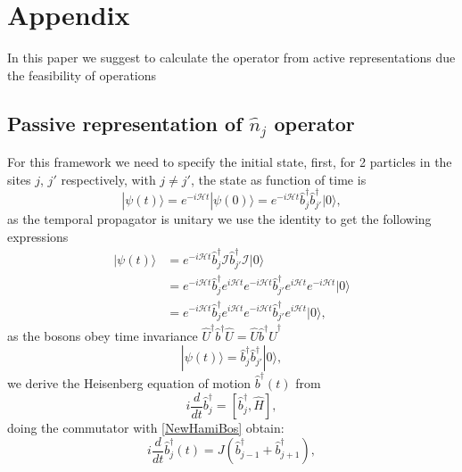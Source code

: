 \section{Appendix} \label{sec:appendix}
In this paper we suggest to calculate the operator from active representations due the feasibility of operations 
\subsection{Passive representation of $\hat{n}_j$ operator}\label{ap:pass}
For this framework we need to specify the initial state, first, for 2 particles in the sites $j$, $j'$ respectively, with $j\neq j'$, the state as function of time is 
\begin{equation} 
|\psi(t) \rangle = e^{-i\mathcal{H} t} |\psi(0)\rangle = e^{-i\mathcal{H} t} \hat{b}_j^\dagger \hat{b}_{j'}^\dagger |0\rangle ,
\end{equation}  
as the temporal propagator is unitary we use the identity to get the following expressions 
\begin{equation}
\begin{split}
    |\psi(t) \rangle &= e^{-i\mathcal{H} t} \hat{b}_j^\dagger \mathcal{I} \hat{b}_{j'}^\dagger \mathcal{I} |0\rangle  \\
         &= e^{-i\mathcal{H} t} \hat{b}_j^\dagger e^{i\mathcal{H} t} e^{-i\mathcal{H} t} \hat{b}_{j'}^\dagger  e^{i\mathcal{H} t} e^{-i\mathcal{H} t} |0\rangle  \\
         &= e^{-i\mathcal{H} t} \hat{b}_j^\dagger e^{i\mathcal{H} t} e^{-i\mathcal{H} t} \hat{b}_{j'}^\dagger  e^{i\mathcal{H} t} |0\rangle,
\end{split}
\end{equation} 
as the bosons obey time invariance $\hat{U}^\dagger \hat{b}^\dagger \hat{U} = \hat{U} \hat{b}^\dagger \hat{U}^\dagger$ 
\begin{equation} 
|\psi(t) \rangle = \hat{b}^\dagger_j \hat{b}_{j'}^\dagger |0\rangle ,
\end{equation}
we derive the Heisenberg equation of motion $\hat{b}^\dagger(t)$ from  
\begin{equation} 
i \frac{d}{dt} \hat{b}_j^\dagger = \left[ \hat{b}_j^\dagger , \hat{H} \right],
\end{equation}
doing the commutator with \eqref{NewHamiBos} obtain: 
\begin{equation} 
i \frac{d}{dt} \hat{b}^\dagger_j(t)= J \left( \hat{b}^\dagger_{j-1} + \hat{b}^\dagger_{j+1} \right) ,
\end{equation} 
